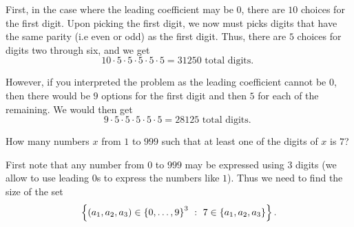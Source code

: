 \begin{chapterendexercises}
\begin{solution}
      First, in the case where the leading coefficient may be $0$, there are
      $10$ choices for the first digit. Upon picking the first digit, we now
      must picks digits that have the same parity (i.e even or odd) as the first
      digit. Thus, there are $5$ choices for digits two through six, and we get
      \[
        10\cdot 5 \cdot 5 \cdot 5 \cdot 5\cdot 5 = 31250 \text{ total digits. }
      \]

      However, if you interpreted the problem as the leading coefficient cannot
      be $0$, then there would be $9$ options for the first digit and then $5$
      for each of the remaining. We would then get
      \[
        9 \cdot 5 \cdot 5 \cdot 5 \cdot 5\cdot 5 = 28125 \text{ total digits. }
      \]
    \end{solution}
  \exercise How many numbers $x$ from $1$ to $999$ such that at least one
    of the digits of $x$ is $7$?
    \begin{solution}
      First note that any number from $0$ to $999$ may be expressed using $3$
      digits (we allow to use leading $0$s to express the numbers like $1$).
      Thus we need to find the size of the set
      \[
        \set[{ 
          7 \in \{a_1, a_2, a_3\}
        }]{(a_1, a_2, a_3) \in \set{0, \dots, 9}^3}.
      \]


\end{solution}
\end{chapterendexercises}
